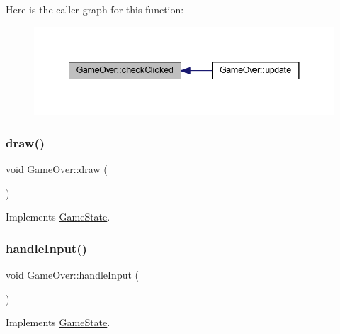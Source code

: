 Here is the caller graph for this function\+:
\nopagebreak
\begin{figure}[H]
\begin{center}
\leavevmode
\includegraphics[width=341pt]{class_game_over_a7239e22d93ea5a1374b5b75af3ed7ed6_icgraph}
\end{center}
\end{figure}
\mbox{\label{class_game_over_a250dc52de3aed814575b8f2df3ecbb06}} 
\subsubsection{\texorpdfstring{draw()}{draw()}}
{\footnotesize\ttfamily void Game\+Over\+::draw (\begin{DoxyParamCaption}{ }\end{DoxyParamCaption})\hspace{0.3cm}{\ttfamily [virtual]}}



Implements \hyperlink{class_game_state_ac872d748df12ac36d7a42a191997e4f7}{Game\+State}.

\mbox{\label{class_game_over_acec786fec9ee289c9fab95b3b067efd0}} 
\subsubsection{\texorpdfstring{handle\+Input()}{handleInput()}}
{\footnotesize\ttfamily void Game\+Over\+::handle\+Input (\begin{DoxyParamCaption}{ }\end{DoxyParamCaption})\hspace{0.3cm}{\ttfamily [virtual]}}



Implements \hyperlink{class_game_state_a970b55edd5a1da31ea0f7113e2c1f85a}{Game\+State}.

